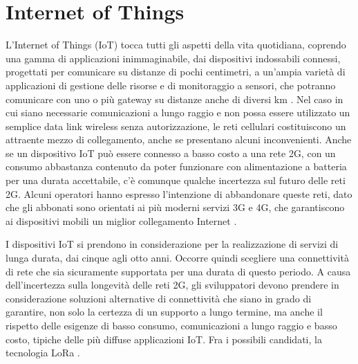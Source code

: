\documentclass[a4paper]{report} %
\begin{document}
\section{Internet of Things}
L'Internet of Things (IoT) tocca tutti gli aspetti della vita quotidiana, coprendo una gamma di applicazioni inimmaginabile, dai dispositivi indossabili connessi, progettati per comunicare su distanze di pochi centimetri, a un'ampia varietà di applicazioni di gestione delle risorse e di monitoraggio a sensori, che potranno comunicare con uno o più gateway su distanze anche di diversi km \cite{art:rif.20, art:rif.21}. 
Nel caso in cui siano necessarie comunicazioni a lungo raggio e non possa essere utilizzato un semplice data link wireless senza autorizzazione, le reti cellulari costituiscono un attraente mezzo di collegamento, anche se presentano alcuni inconvenienti. Anche se un dispositivo IoT può essere connesso a basso costo a una rete 2G, con un consumo abbastanza contenuto da poter funzionare con alimentazione a batteria per una durata accettabile, c'è comunque qualche incertezza sul futuro delle reti 2G. Alcuni operatori hanno espresso l'intenzione di abbandonare queste reti, dato che gli abbonati sono orientati ai più moderni servizi 3G e 4G, che garantiscono ai dispositivi mobili un miglior collegamento Internet \cite{art:rif.20, art:rif.21}.
 
I dispositivi IoT si prendono in considerazione per la realizzazione di servizi di lunga durata, dai cinque agli otto anni. Occorre quindi scegliere una connettività di rete che sia sicuramente supportata per una durata di questo periodo. A causa dell'incertezza sulla longevità delle reti 2G, gli sviluppatori devono prendere in considerazione soluzioni alternative di connettività che siano in grado di garantire, non solo la certezza di un supporto a lungo termine, ma anche il rispetto delle esigenze di basso consumo, comunicazioni a lungo raggio e basso costo, tipiche delle più diffuse applicazioni IoT. Fra i possibili candidati, la tecnologia LoRa \cite{art:rif.20, art:rif.21}. 
\end{document}

